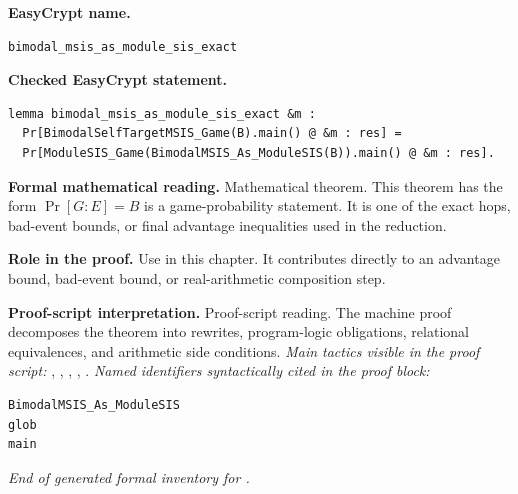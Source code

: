 \begin{formaltheorem}
\noindent\textbf{EasyCrypt name.}
\begin{lstlisting}[language=EasyCrypt,basicstyle=\ttfamily\scriptsize]
bimodal_msis_as_module_sis_exact
\end{lstlisting}
\noindent\textbf{Checked EasyCrypt statement.}
\begin{lstlisting}[language=EasyCrypt,basicstyle=\ttfamily\scriptsize]
lemma bimodal_msis_as_module_sis_exact &m :
  Pr[BimodalSelfTargetMSIS_Game(B).main() @ &m : res] =
  Pr[ModuleSIS_Game(BimodalMSIS_As_ModuleSIS(B)).main() @ &m : res].
\end{lstlisting}
\noindent\textbf{Formal mathematical reading.}
Mathematical theorem. This theorem has the form \(\Pr[G:E] = B\) is a game-probability statement.  It is one of the exact hops, bad-event bounds, or final advantage inequalities used in the reduction.

\noindent\textbf{Role in the proof.}
Use in this chapter. It contributes directly to an advantage bound, bad-event bound, or real-arithmetic composition step.

\noindent\textbf{Proof-script interpretation.}
Proof-script reading. The machine proof decomposes the theorem into rewrites, program-logic obligations, relational equivalences, and arithmetic side conditions.
\emph{Main tactics visible in the proof script:} , , , , .
\emph{Named identifiers syntactically cited in the proof block:}
\begin{lstlisting}[language=EasyCrypt,basicstyle=\ttfamily\scriptsize]
BimodalMSIS_As_ModuleSIS
glob
main
\end{lstlisting}

\end{formaltheorem}

\medskip
\noindent\emph{End of generated formal inventory for .}
